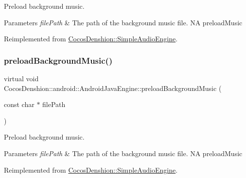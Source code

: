Preload background music.


\begin{DoxyParams}{Parameters}
{\em file\+Path} & The path of the background music file.  NA  preload\+Music \\
\hline
\end{DoxyParams}


Reimplemented from \hyperlink{classCocosDenshion_1_1SimpleAudioEngine_a7d0737ff7a321c11ed9e3467e41f1cf9}{Cocos\+Denshion\+::\+Simple\+Audio\+Engine}.

\mbox{\label{classCocosDenshion_1_1android_1_1AndroidJavaEngine_afa06edc30986b357a9bb65f053260af0}} 
\subsubsection{\texorpdfstring{preload\+Background\+Music()}{preloadBackgroundMusic()}\hspace{0.1cm}{\footnotesize\ttfamily [2/2]}}
{\footnotesize\ttfamily virtual void Cocos\+Denshion\+::android\+::\+Android\+Java\+Engine\+::preload\+Background\+Music (\begin{DoxyParamCaption}\item[{const char $\ast$}]{file\+Path }\end{DoxyParamCaption})\hspace{0.3cm}{\ttfamily [virtual]}}

Preload background music.


\begin{DoxyParams}{Parameters}
{\em file\+Path} & The path of the background music file.  NA  preload\+Music \\
\hline
\end{DoxyParams}


Reimplemented from \hyperlink{classCocosDenshion_1_1SimpleAudioEngine_a7d0737ff7a321c11ed9e3467e41f1cf9}{Cocos\+Denshion\+::\+Simple\+Audio\+Engine}.

\mbox{\label{classCocosDenshion_1_1android_1_1AndroidJavaEngine_ab6bfd3367f805e7df12ed912e7933c22}} 
